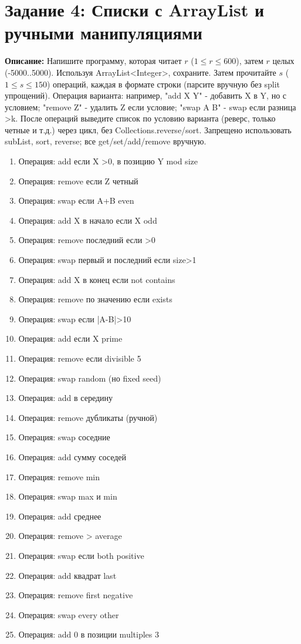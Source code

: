 \documentclass[12pt]{article}
\begin{document}
\section*{Задание 4: Списки с ArrayList и ручными манипуляциями}
  \textbf{Описание:} Напишите программу, которая читает $r$ ($1 \leq r \leq 600$), затем $r$ целых (-5000..5000). Используя ArrayList<Integer>, сохраните. Затем прочитайте $s$ ($1 \leq s \leq 150$) операций, каждая в формате строки (парсите вручную без split упрощений). Операция варианта: например, "add X Y" - добавить X в Y, но с условием; "remove Z" - удалить Z если условие; "swap A B" - swap если разница >k. После операций выведите список по условию варианта (реверс, только четные и т.д.) через цикл, без Collections.reverse/sort. Запрещено использовать subList, sort, reverse; все get/set/add/remove вручную.

  \begin{enumerate}
    \item Операция: add если X >0, в позицию Y mod size
    \item Операция: remove если Z четный
    \item Операция: swap если A+B even
    \item Операция: add X в начало если X odd
    \item Операция: remove последний если >0
    \item Операция: swap первый и последний если size>1
    \item Операция: add X в конец если not contains
    \item Операция: remove по значению если exists
    \item Операция: swap если |A-B|>10
    \item Операция: add если X prime
    \item Операция: remove если divisible 5
    \item Операция: swap random (но fixed seed)
    \item Операция: add в середину
    \item Операция: remove дубликаты (ручной)
    \item Операция: swap соседние
    \item Операция: add сумму соседей
    \item Операция: remove min
    \item Операция: swap max и min
    \item Операция: add среднее
    \item Операция: remove > average
    \item Операция: swap если both positive
    \item Операция: add квадрат last
    \item Операция: remove first negative
    \item Операция: swap every other
    \item Операция: add 0 в позиции multiples 3
  \end{enumerate}
\end{document}
